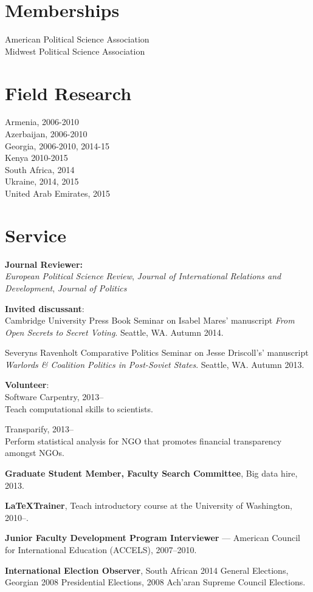 \documentclass[margin,line]{res}
\begin{document}
{\begin{resume}
\section{\sc Memberships}
American Political Science Association \\
Midwest Political Science Association

\section{\sc Field Research}
Armenia, 2006-2010  \\
Azerbaijan, 2006-2010\\
Georgia, 2006-2010, 2014-15 \\
Kenya 2010-2015 \\
South Africa, 2014 \\
Ukraine, 2014, 2015 \\
United Arab Emirates, 2015 \\

\section{\sc Service}
\textbf{Journal Reviewer: }\\
\emph{European Political Science Review}, \emph{Journal of International Relations and
  Development}, \emph{Journal of Politics} \par\smallskip
\textbf{Invited discussant}: \\
  Cambridge University Press Book Seminar on
Isabel Mares' manuscript \emph{From Open Secrets to Secret Voting}. Seattle, WA. Autumn 2014. \par\smallskip
 Severyns Ravenholt Comparative Politics Seminar on
Jesse Driscoll's' manuscript \emph{Warlords \& Coalition Politics in
  Post-Soviet States}. Seattle, WA. Autumn 2013. \par\smallskip
\textbf{Volunteer}: \\
Software Carpentry, 2013--  \\
Teach computational skills to
scientists.\par\smallskip
Transparify, 2013--\\
 Perform statistical analysis for NGO that promotes
financial transparency amongst NGOs.  \par\smallskip
\textbf{Graduate Student Member, Faculty Search Committee}, Big data
hire, 2013. \par\smallskip
\textbf{\LaTeX Trainer}, Teach introductory \latex course at the University of
Washington, 2010--. \par\smallskip
\textbf{Junior Faculty Development Program Interviewer} --- American Council for
International Education (ACCELS), 2007--2010. \par\smallskip
\textbf{International Election Observer}, South African 2014 General
Elections, Georgian 2008 Presidential Elections, 2008 Ach'aran Supreme
Council Elections. 


\end{resume}}
\end{document}
